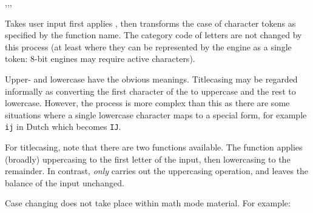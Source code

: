 \documentclass[oneside]{book}
\begin{document}
\begin{function}{\TextLowercase,\TextUppercase,\TextTitlecase,\TextTitlecaseFirst}
\begin{syntax}
  
  
  
  
\end{syntax}
Takes user input  first applies , then
transforms the case of character tokens as specified by the
function name. The category code of letters are not changed by this
process (at least where they can be represented by the engine as a single
token: $8$-bit engines may require active characters).
\par
Upper- and lowercase have the obvious meanings. Titlecasing may be regarded
informally as converting the first character of the  to
uppercase and the rest to lowercase. However, the process is more complex
than this as there are some situations where a single lowercase character
maps to a special form, for example \texttt{ij} in Dutch which becomes
\texttt{IJ}.
\par
For titlecasing, note that there are two functions available. The
function  applies (broadly) uppercasing to the first
letter of the input, then lowercasing to the remainder. In contrast,
 \emph{only} carries out the uppercasing operation,
and leaves the balance of the input unchanged.
\par
Case changing does not take place within math mode material. For example:
\begin{demohigh}
\end{demohigh}
\begin{demohigh}
\end{demohigh}
\end{function}
\end{document}
